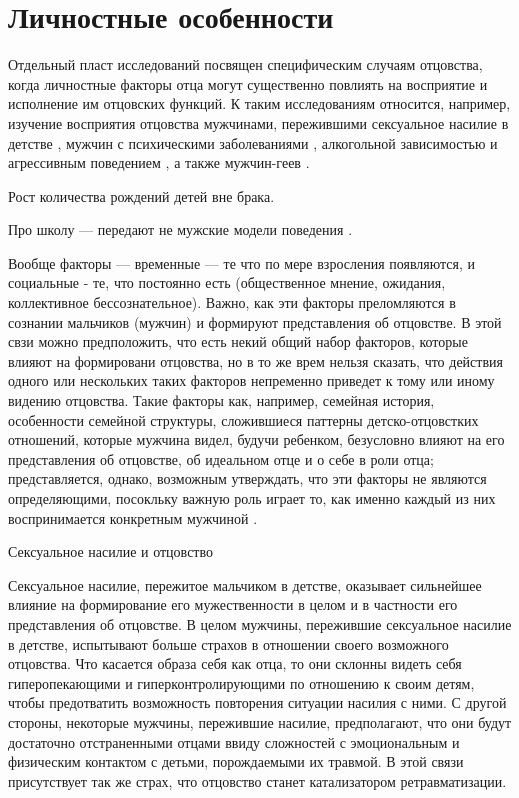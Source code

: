 \documentclass{../../common/thesisbyxetex}
\begin{document}
\section{Личностные особенности} 

Отдельный пласт исследований посвящен специфическим случаям отцовства, когда личностные факторы 
отца могут существенно повлиять на восприятие и исполнение им отцовских функций. К таким 
исследованиям относится, например, изучение восприятия отцовства мужчинами, пережившими сексуальное 
насилие в детстве \cite{sex}, мужчин с психическими заболеваниями \cite{gbi}, алкогольной 
зависимостью и агрессивным поведением \cite{alc}, а также мужчин-геев \cite{gay}.

Рост количества рождений детей вне брака.

Про школу --- передают не мужские модели поведения \cite{md}.


Вообще факторы --- временные --- те что по мере взросления появляются, и социальные - те, что 
постоянно есть (общественное мнение, ожидания, коллективное бессознательное). Важно, как эти 
факторы преломляются в сознании мальчиков (мужчин) и формируют представления об отцовстве. В этой 
свзи можно предположить, что есть некий общий набор факторов, которые влияют на формировани 
отцовства, но в то же врем нельзя сказать, что действия одного или нескольких таких факторов 
непременно приведет к тому или иному видению отцовства. Такие факторы как, например, семейная 
история, особенности семейной структуры, сложившиеся паттерны детско-отцовстких отношений, 
которые мужчина видел, будучи ребенком, безусловно влияют на его представления об отцовстве, об 
идеальном отце и о себе в роли отца; представляется, однако, возможным утверждать, что эти 
факторы не являются определяющими, посокльку важную роль играет то, как именно каждый из них 
воспринимается конкретным мужчиной \cite[164]{long}. 

\cite[164]{long}

Сексуальное насилие и отцовство

Сексуальное насилие, пережитое мальчиком в детстве, оказывает сильнейшее влияние на формирование 
его мужественности в целом и в частности его представления об отцовстве. В целом мужчины, 
пережившие сексуальное насилие в детстве, испытывают больше страхов в отношении своего возможного 
отцовства.  Что касается образа себя как отца, то они склонны видеть себя гиперопекающими  и 
гиперконтролирующими по отношению к своим детям, чтобы предотватить возможность повторения 
ситуации насилия с ними. С другой стороны, некоторые мужчины, пережившие насилие, предполагают, 
что они будут достаточно отстраненными отцами ввиду сложностей с эмоциональным и физическим 
контактом с детьми, порождаемыми их травмой. В этой связи присутствует так же страх, что отцовство 
станет катализатором ретравматизации.
\end{document}
